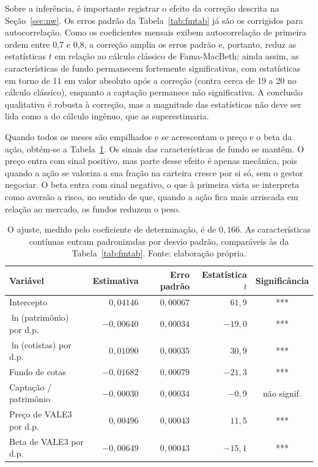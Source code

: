 \documentclass[12pt,a4paper]{article}
\begin{document}
Sobre a inferência, é importante registrar o efeito da correção descrita na Seção~\ref{sec:nw}.
Os erros padrão da Tabela~\ref{tab:fmtab} já são os corrigidos para autocorrelação. Como os
coeficientes mensais exibem autocorrelação de primeira ordem entre 0,7 e 0,8, a correção amplia os
erros padrão e, portanto, reduz as estatísticas $t$ em relação ao cálculo clássico de
Fama-MacBeth; ainda assim, as características de fundo permanecem fortemente significativas, com
estatísticas em torno de 11 em valor absoluto após a correção (contra cerca de 19 a 20 no cálculo
clássico), enquanto a captação permanece não significativa. A conclusão qualitativa é robusta à correção, mas a magnitude das estatísticas não
deve ser lida como a do cálculo ingênuo, que as superestimaria.

Quando todos os meses são empilhados e se acrescentam o preço e o beta da ação, obtém-se a
Tabela~\ref{tab:pool}. Os sinais das características de fundo se mantêm. O preço entra com sinal
positivo, mas parte desse efeito é apenas mecânica, pois quando a ação se valoriza a sua fração na
carteira cresce por si só, sem o gestor negociar. O beta entra com sinal negativo, o que à
primeira vista se interpreta como aversão a risco, no sentido de que, quando a ação fica mais
arriscada em relação ao mercado, os fundos reduzem o peso.

\begin{table}[h]\centering\small
\caption{Regressão com todos os meses empilhados, incluindo preço e beta (11.413 observações).}
\label{tab:pool}
\begin{tabular}{@{}lrrrc@{}}
\toprule
Variável & Estimativa & Erro padrão & Estatística $t$ & Significância \\
\midrule
Intercepto                 & $0{,}04146$  & $0{,}00067$ & $61{,}9$  & *** \\
$\ln$(patrimônio) por d.p. & $-0{,}00640$ & $0{,}00034$ & $-19{,}0$ & *** \\
$\ln$(cotistas) por d.p.   & $0{,}01090$  & $0{,}00035$ & $30{,}9$  & *** \\
Fundo de cotas             & $-0{,}01682$ & $0{,}00079$ & $-21{,}3$ & *** \\
Captação / patrimônio      & $-0{,}00030$ & $0{,}00034$ & $-0{,}9$  & não signif. \\
Preço de VALE3 por d.p.    & $0{,}00496$  & $0{,}00043$ & $11{,}5$  & *** \\
Beta de VALE3 por d.p.     & $-0{,}00649$ & $0{,}00043$ & $-15{,}1$ & *** \\
\bottomrule
\end{tabular}
\caption*{\footnotesize O ajuste, medido pelo coeficiente de determinação, é de $0{,}166$. As
características contínuas entram padronizadas por desvio padrão, comparáveis às da
Tabela~\ref{tab:fmtab}. Fonte: elaboração própria.}
\end{table}
\end{document}
